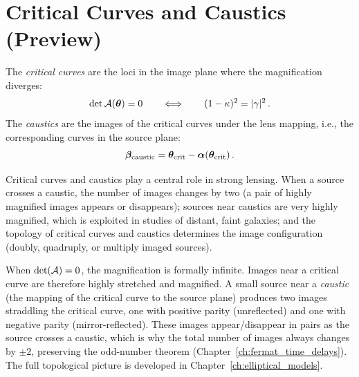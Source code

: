 \section{Critical Curves and Caustics (Preview)}
\label{sec:critical_curves_preview}

\begin{definition}
The \emph{critical curves} are the loci in the image plane where
the magnification diverges:
\begin{equation}
    \det \mathcal{A}(\boldsymbol{\theta}) = 0
    \qquad \Longleftrightarrow \qquad
    (1 - \kappa)^2 = |\gamma|^2 \,.
    \label{eq:critical_curve_condition}
\end{equation}
The \emph{caustics} are the images of the critical curves under the
lens mapping, i.e., the corresponding curves in the source plane:
\begin{equation}
    \boldsymbol{\beta}_{\mathrm{caustic}} = \boldsymbol{\theta}_{\mathrm{crit}}
    - \boldsymbol{\alpha}(\boldsymbol{\theta}_{\mathrm{crit}}) \,.
    \label{eq:caustic_def}
\end{equation}
\end{definition}

Critical curves and caustics play a central role in strong lensing.
When a source crosses a caustic, the number of images changes by two
(a pair of highly magnified images appears or disappears); sources near
caustics are very highly magnified, which is exploited in studies of
distant, faint galaxies; and the topology of critical curves and
caustics determines the image configuration (doubly, quadruply, or
multiply imaged sources).

\begin{remark}
When $\det(\mathcal{A}) = 0$, the magnification is formally infinite.
Images near a critical curve are therefore highly
stretched and magnified.  A small source near a \textit{caustic} (the
mapping of the critical curve to the source plane) produces two images
straddling the critical curve, one with positive parity (unreflected)
and one with negative parity (mirror-reflected).  These images
appear/disappear in pairs as the source crosses a caustic, which is why
the total number of images always changes by $\pm 2$, preserving the
odd-number theorem (Chapter~\ref{ch:fermat_time_delays}).  The full topological picture is
developed in Chapter~\ref{ch:elliptical_models}.
\end{remark}

